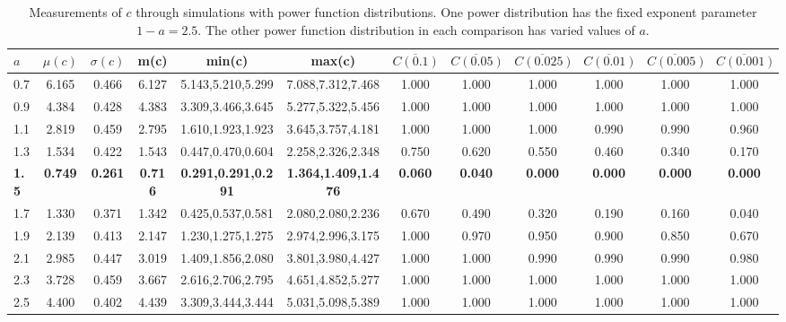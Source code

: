 \begin{table*}[h!]
\begin{center}
\begin{tabular}{| l | c | c | c | c | c | c | c | c | c | c | c |}\hline
$a$ & $\mu(c)$ & $\sigma(c)$ & m(c) & min(c) & max(c) & $\overline{C(0.1)}$ & $\overline{C(0.05)}$ & $\overline{C(0.025)}$ & $\overline{C(0.01)}$ & $\overline{C(0.005)}$ & $\overline{C(0.001)}$ \\\hline\hline
0.7 & 6.165 & 0.466 & 6.127 & 5.143,5.210,5.299 & 7.088,7.312,7.468  & 1.000  & 1.000  & 1.000  & 1.000  & 1.000  & 1.000 \\\hline
0.9 & 4.384 & 0.428 & 4.383 & 3.309,3.466,3.645 & 5.277,5.322,5.456  & 1.000  & 1.000  & 1.000  & 1.000  & 1.000  & 1.000 \\\hline
1.1 & 2.819 & 0.459 & 2.795 & 1.610,1.923,1.923 & 3.645,3.757,4.181  & 1.000  & 1.000  & 1.000  & 0.990  & 0.990  & 0.960 \\\hline
1.3 & 1.534 & 0.422 & 1.543 & 0.447,0.470,0.604 & 2.258,2.326,2.348  & 0.750  & 0.620  & 0.550  & 0.460  & 0.340  & 0.170 \\\hline
{\bf 1.5} & {\bf 0.749} & {\bf 0.261} & {\bf 0.716} & {\bf 0.291,0.291,0.291} & {\bf 1.364,1.409,1.476} & {\bf 0.060} & {\bf 0.040} & {\bf 0.000} & {\bf 0.000} & {\bf 0.000} & {\bf 0.000} \\\hline
1.7 & 1.330 & 0.371 & 1.342 & 0.425,0.537,0.581 & 2.080,2.080,2.236  & 0.670  & 0.490  & 0.320  & 0.190  & 0.160  & 0.040 \\\hline
1.9 & 2.139 & 0.413 & 2.147 & 1.230,1.275,1.275 & 2.974,2.996,3.175  & 1.000  & 0.970  & 0.950  & 0.900  & 0.850  & 0.670 \\\hline
2.1 & 2.985 & 0.447 & 3.019 & 1.409,1.856,2.080 & 3.801,3.980,4.427  & 1.000  & 1.000  & 0.990  & 0.990  & 0.990  & 0.980 \\\hline
2.3 & 3.728 & 0.459 & 3.667 & 2.616,2.706,2.795 & 4.651,4.852,5.277  & 1.000  & 1.000  & 1.000  & 1.000  & 1.000  & 1.000 \\\hline
2.5 & 4.400 & 0.402 & 4.439 & 3.309,3.444,3.444 & 5.031,5.098,5.389  & 1.000  & 1.000  & 1.000  & 1.000  & 1.000  & 1.000 \\\hline
\end{tabular}
\caption{Measurements of $c$ through simulations
with power function distributions.
One power distribution has the fixed exponent parameter $1-a=2.5$.
The other power function distribution in each comparison
has varied values of $a$.}
\end{center}
\end{table*}